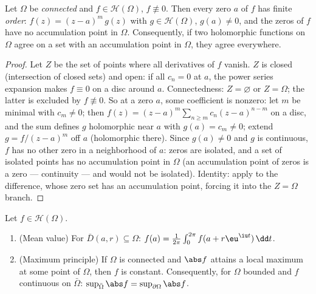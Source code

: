 \begin{theorem}
\label{thm:b3:holomorphic:identity}
Let $\Omega$ be \emph{connected} and $f \in \mathcal
H(\Omega)$, $f \not\equiv 0$. Then every zero $a$ of $f$ has
finite \emph{order}: $f(z) = (z - a)^m\,g(z)$ with $g \in
\mathcal H(\Omega)$, $g(a) \neq 0$, and the zeros of $f$ have
no accumulation point in $\Omega$. Consequently, if two
holomorphic functions on $\Omega$ agree on a set with an
accumulation point in $\Omega$, they agree
everywhere.
\end{theorem}

\begin{proof}
Let $Z$ be the set of points where all derivatives of $f$
vanish. $Z$ is closed (intersection of closed sets) and open:
if all $c_n = 0$ at $a$, the power series expansion makes $f
\equiv 0$ on a disc around $a$. Connectedness: $Z =
\varnothing$ or $Z = \Omega$; the latter is excluded by $f
\not\equiv 0$. So at a zero $a$, some coefficient is nonzero:
let $m$ be minimal with $c_m \neq 0$; then $f(z) = (z -
a)^m\sum_{n\geq m}c_n(z-a)^{n-m}$ on a disc, and the sum
defines $g$ holomorphic near $a$ with $g(a) = c_m \neq 0$;
extend $g = f/(z-a)^m$ off $a$ (holomorphic there). Since
$g(a) \neq 0$ and $g$ is continuous, $f$ has no other zero in
a neighborhood of $a$: zeros are isolated, and a set of
isolated points has no accumulation point in $\Omega$ (an
accumulation point of zeros is a zero --- continuity --- and
would not be isolated). Identity: apply to the difference,
whose zero set has an accumulation point, forcing it into the
$Z = \Omega$ branch.
\end{proof}

\begin{theorem}
\label{thm:b3:holomorphic:maximum}
Let $f \in \mathcal H(\Omega)$.
\begin{enumerate}
  \item (Mean value) For $\bar D(a, r) \subseteq \Omega$:
        $f(a) = \frac1{2\pi}\int_0^{2\pi}f(a +
        r\eu^{\iu t})\,\dd t$.
  \item (Maximum principle) If $\Omega$ is connected and
        $\abs f$ attains a local maximum at some point of
        $\Omega$, then $f$ is constant. Consequently, for
        $\Omega$ bounded and $f$ continuous on
        $\bar\Omega$: $\sup_{\bar\Omega}\abs f =
        \sup_{\partial\Omega}\abs f$.
\end{enumerate}
\end{theorem}

